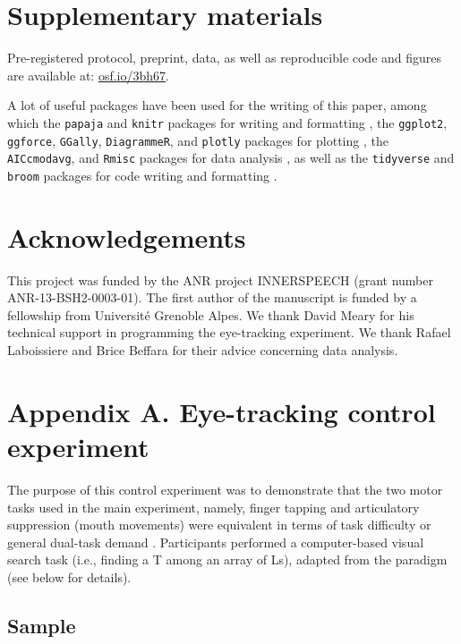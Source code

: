 \documentclass[12pt,]{book}
\theoremstyle{definition}
\theoremstyle{definition}
\theoremstyle{definition}
\theoremstyle{remark}
\begin{document}
\hypertarget{supp}{\section{Supplementary materials}\label{supp}}

Pre-registered protocol, preprint, data, as well as reproducible code
and figures are available at: \href{http://osf.io/3bh67}{osf.io/3bh67}.

A lot of useful packages have been used for the writing of this paper,
among which the \texttt{papaja} and \texttt{knitr} packages for writing
and formatting \citep{R-papaja, R-knitr}, the \texttt{ggplot2},
\texttt{ggforce}, \texttt{GGally}, \texttt{DiagrammeR}, and
\texttt{plotly} packages for plotting
\citep{R-ggplot2, R-ggforce, R-GGally, R-DiagrammeR, R-plotly}, the
\texttt{AICcmodavg}, and \texttt{Rmisc} packages for data analysis
\citep{R-AICcmodavg, R-Rmisc}, as well as the \texttt{tidyverse} and
\texttt{broom} packages for code writing and formatting
\citep{R-broom, R-tidyverse}.

\section{Acknowledgements}\label{acknowledgements-1}

This project was funded by the ANR project INNERSPEECH (grant number
ANR-13-BSH2-0003-01). The first author of the manuscript is funded by a
fellowship from Université Grenoble Alpes. We thank David Meary for his
technical support in programming the eye-tracking experiment. We thank
Rafael Laboissiere and Brice Beffara for their advice concerning data
analysis.

\section{Appendix A. Eye-tracking control
experiment}\label{appendix-a.-eye-tracking-control-experiment}

The purpose of this control experiment was to demonstrate that the two
motor tasks used in the main experiment, namely, finger tapping and
articulatory suppression (mouth movements) were equivalent in terms of
task difficulty or general dual-task demand \citep{Emerson2003}.
Participants performed a computer-based visual search task (i.e.,
finding a T among an array of Ls), adapted from the \citet{Treisman1980}
paradigm (see below for details).

\subsection{Sample}\label{sample-1}
\end{document}
